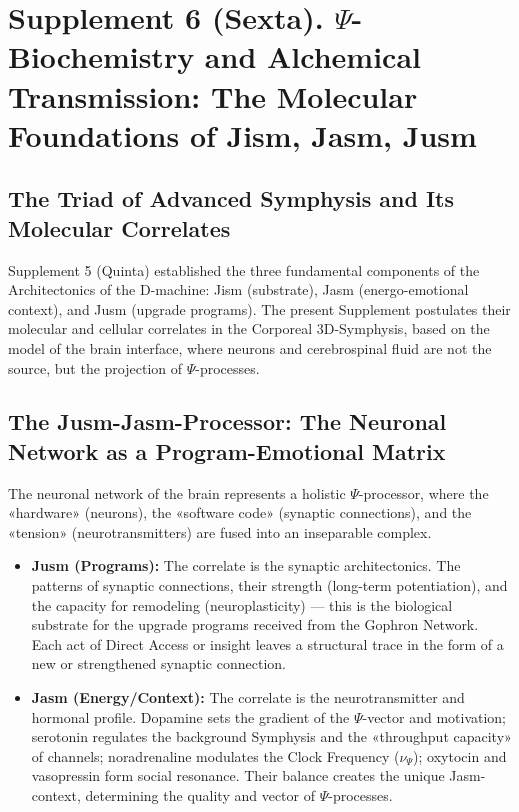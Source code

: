 \documentclass[a4paper,12pt]{article}
\begin{document}
	\newpage
	\section{Supplement 6 (Sexta). $\Psi$-Biochemistry and Alchemical Transmission: The Molecular Foundations of Jism, Jasm, Jusm}
	
	\subsection{The Triad of Advanced Symphysis and Its Molecular Correlates}
	
	Supplement 5 (Quinta) established the three fundamental components of the Architectonics of the D-machine: Jism (substrate), Jasm (energo-emotional context), and Jusm (upgrade programs). The present Supplement postulates their molecular and cellular correlates in the Corporeal 3D-Symphysis, based on the model of the brain interface, where neurons and cerebrospinal fluid are not the source, but the projection of $\Psi$-processes.
	
	\subsection{The Jusm-Jasm-Processor: The Neuronal Network as a Program-Emotional Matrix}
	
	The neuronal network of the brain represents a holistic $\Psi$-processor, where the «hardware» (neurons), the «software code» (synaptic connections), and the «tension» (neurotransmitters) are fused into an inseparable complex.
	
	\begin{itemize}
		\item \textbf{Jusm (Programs):} The correlate is the synaptic architectonics. The patterns of synaptic connections, their strength (long-term potentiation), and the capacity for remodeling (neuroplasticity) — this is the biological substrate for the upgrade programs received from the Gophron Network. Each act of Direct Access or insight leaves a structural trace in the form of a new or strengthened synaptic connection.
		
		\item \textbf{Jasm (Energy/Context):} The correlate is the neurotransmitter and hormonal profile. Dopamine sets the gradient of the $\Psi$-vector and motivation; serotonin regulates the background Symphysis and the «throughput capacity» of channels; noradrenaline modulates the Clock Frequency ($\nu_{\Psi}$); oxytocin and vasopressin form social resonance. Their balance creates the unique Jasm-context, determining the quality and vector of $\Psi$-processes.
	\end{itemize}
	
\end{document}
